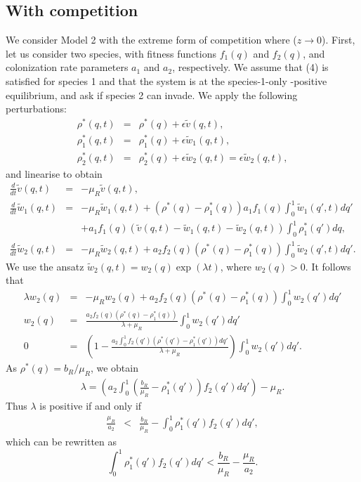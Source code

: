 \documentclass[8pt,a4paper]{article}
\begin{document}
\subsection{With competition}
We consider Model 2 with the  extreme form of competition where ($z \rightarrow 0$). First, let us consider two species, with fitness functions $f_1(q)$ and $f_2(q)$, and colonization rate parameters $a_1$ and $a_2$, respectively. We assume that (4) is satisfied for species 1 and that the system is at the species-1-only -positive equilibrium, and ask if species 2 can  invade. We apply the following perturbations: 
\begin{eqnarray*}
 \rho^*(q,t)&= &\rho^*(q)+\epsilon \tilde{v}(q,t), \\
 \rho_1^*(q,t)&= &\rho_1^*(q)+\epsilon \tilde{w}_1(q,t), \\
 \rho_2^*(q,t)&= &\rho_2^*(q)+\epsilon \tilde{w}_2(q,t)=\epsilon \tilde{w}_2(q,t),
\end{eqnarray*} 
and linearise to obtain 
\begin{eqnarray*}
\frac{d}{dt} \tilde{v}(q,t) &=& - \mu_R \tilde{v}(q,t),\\
\frac{d}{d t} \tilde{w}_1(q,t) &=& -\mu_R \tilde{w}_1(q,t)+\left(\rho^*(q)-\rho_1^*(q)\right)a_1 f_1(q)\int_0^1 \tilde{w}_1(q',t) dq' \\
& & + a_1 f_1(q) \left(\tilde{v}(q,t)-\tilde{w}_1(q,t)-\tilde{w}_2(q,t)\right)\int_0^1 \rho_1^*(q')dq ,\\
\frac{d}{d t} \tilde{w}_2(q,t) &=& -\mu_R \tilde{w}_2(q,t)+ a_2 f_2(q) \left(\rho^*(q)-\rho_1^*(q)\right) \int_0^1 \tilde{w}_2(q',t) dq'.
\end{eqnarray*}
We use the ansatz  $\tilde{w}_2(q,t)=w_2(q) \exp(\lambda t)$, where $ w_2(q) >0 $. It follows that
\begin{eqnarray*}
\lambda w_2(q)&=& -\mu_R w_2(q)+ a_2 f_2(q)  \left(\rho^*(q)-\rho_1^*(q) \right) \int_0^1 w_2(q') dq'\\ 
w_2(q)&=&\frac{a_2 f_2(q) \left(\rho^*(q)-\rho_1^*(q) \right)}{\lambda + \mu_R} \int_0^1 w_2(q') dq'\\
0&=&\left(1-\frac{a_2 \int_0^1  f_2(q') \left(\rho^*(q')-\rho_1^*(q') \right)dq'}{\lambda + \mu_R} \right)  \int_0^1 w_2(q') dq'.
\end{eqnarray*} 
As $\rho^*(q)= b_R/\mu_R$, we obtain 
\begin{eqnarray*}
 \lambda =\left( a_2 \int_0^1 \left( \frac{b_R}{\mu_R} - \rho_1^*(q')\right) f_2(q')dq' \right)-\mu_R. 
\end{eqnarray*}
Thus $\lambda$ is positive if and only if
\begin{eqnarray*}
 \frac{\mu_R}{a_2} & < &\frac{b_R}{\mu_R} -\int_0^1 \rho_1^*(q') f_2(q') dq',
\end{eqnarray*}
which can be rewritten as 
\begin{equation}
\int_0^1 \rho_1^*(q') f_2(q')dq'  < \frac{b_R}{\mu_R} -\frac{\mu_R}{a_2}. 
\end{equation}
\end{document}
